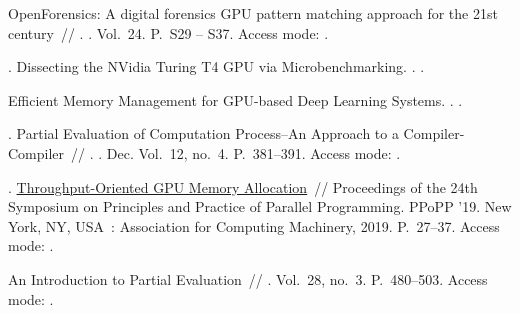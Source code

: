 \begin{thebibliography}{10}
   OpenForensics: A digital
    forensics GPU pattern matching approach for the 21st century~//
    \href{http://dx.doi.org/https://doi.org/10.1016/j.diin.2018.01.005}{}. \BibDash
  . \BibDash
  \newblock Vol.~24. \BibDash
  \newblock P.~S29 -- S37. \BibDash
  \newblock Access mode:
    .
  
  .
    Dissecting the NVidia Turing T4 GPU via Microbenchmarking. \BibDash
  . \BibDash
  .
  
   Efficient Memory
    Management for GPU-based Deep Learning Systems. \BibDash
  . \BibDash
  .
  
  . Partial Evaluation of Computation Process--An
    Approach to a Compiler-Compiler~//
    \href{http://dx.doi.org/10.1023/A:1010095604496}{}. \BibDash
  . \BibDash Dec. \BibDash
  \newblock Vol.~12, no.~4. \BibDash
  \newblock P.~381--391. \BibDash
  \newblock Access mode: .
  
  .
    \href{http://dx.doi.org/10.1145/3293883.3295727}{Throughput-Oriented GPU
    Memory Allocation}~// Proceedings of the 24th Symposium on Principles and
    Practice of Parallel Programming. \BibDash
  \newblock PPoPP ’19. \BibDash
  \newblock New York, NY, USA~: Association for Computing Machinery, 2019.
    \BibDash
  \newblock P.~27–37. \BibDash
  \newblock Access mode: .
  
   An Introduction to Partial Evaluation~//
    \href{http://dx.doi.org/10.1145/243439.243447}{}
    \BibDash
  . \BibDash
  \newblock Vol.~28, no.~3. \BibDash
  \newblock P.~480--503. \BibDash
  \newblock Access mode: .
  

\end{thebibliography}
